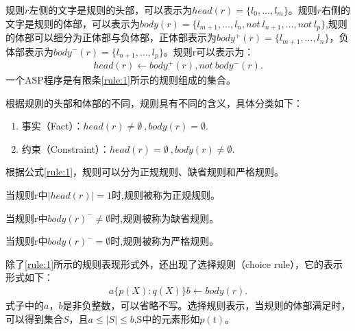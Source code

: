规则$r$左侧的文字是规则的头部，可以表示为$head(r)=\{l_0,\ldots,l_m\}$。规则$r$右侧的文字是规则的体部，可以表示为$body(r)=\{l_{m+1}, \ldots, l_n,not\ l_{n+1},\ldots,not \ l_p \}$,规则的体部可以细分为正体部与负体部，正体部表示为$body^+(r)=\{l_{m+1}, \ldots, l_n\}$，负体部表示为$body^-(r)=\{l_{n+1}, \ldots, l_p \}$。规则r可以表示为：
\begin{align}
    \label{rule:2}
    head(r)\leftarrow body^+(r),not\ body^-(r).
\end{align}
一个ASP程序是有限条\eqref{rule:1}所示的规则组成的集合。

根据规则的头部和体部的不同，规则具有不同的含义，具体分类如下：
\begin{enumerate}[label=(\arabic*),topsep=0pt]
    \setlength\itemsep{-0.3em}
    \item 事实（Fact）：$ head(r) \neq \emptyset \ ,body(r) = \emptyset .$
    \item 约束（Constraint）：$ head(r) = \emptyset \ ,body(r) \neq \emptyset .$
\end{enumerate}

根据公式\eqref{rule:1}，规则可以分为正规规则、缺省规则和严格规则。
\begin{definition}[正规规则]当规则r中$|head(r)|=1$时,规则被称为正规规则。
\end{definition}
\begin{definition}[缺省规则]当规则r中$body(r)^- \neq \emptyset$时,规则被称为缺省规则。
\end{definition}
\begin{definition}[严格规则]当规则r中$body(r)^- = \emptyset$时,规则被称为严格规则。
\end{definition}
除了\eqref{rule:1}所示的规则表现形式外，还出现了选择规则（choice rule），它的表示形式如下：
\begin{align}
    \label{rule:3}
    a \{p(X):q(X)\} b \leftarrow body(r) .
\end{align}
式子中的$a$，$b$是非负整数，可以省略不写。选择规则表示，当规则的体部满足时，可以得到集合$S$，且$a \leq |S| \leq b$,S中的元素形如$p(t)$。


